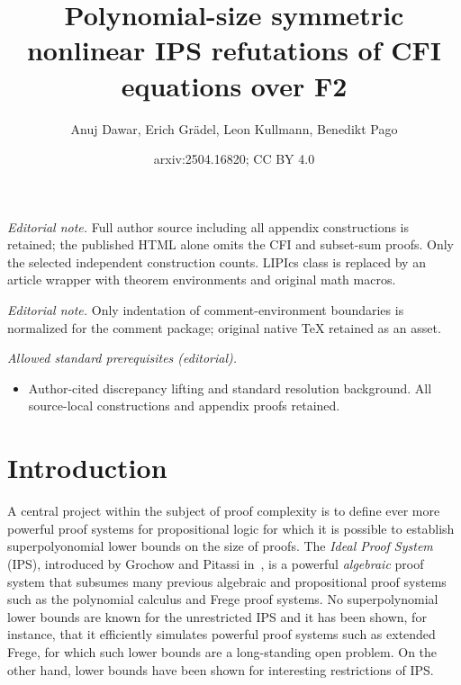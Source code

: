 \documentclass[10pt,a4paper]{article}
\title{Polynomial-size symmetric nonlinear IPS refutations of CFI equations over F2}
\author{Anuj Dawar, Erich Grädel, Leon Kullmann, Benedikt Pago}
\date{arxiv:2504.16820; CC BY 4.0}
\begin{document}
\maketitle
\noindent\textit{Editorial note.} Full author source including all appendix constructions is retained; the published HTML alone omits the CFI and subset-sum proofs. Only the selected independent construction counts. LIPIcs class is replaced by an article wrapper with theorem environments and original math macros.\par\medskip
\noindent\textit{Editorial note.} Only indentation of comment-environment boundaries is normalized for the comment package; original native TeX retained as an asset.\par\medskip
\noindent\textit{Allowed standard prerequisites (editorial).}\begin{itemize}
\item Author-cited discrepancy lifting and standard resolution background. All source-local constructions and appendix proofs retained.
\end{itemize}\medskip
	\section{Introduction}
	A central project within the subject of proof complexity \cite{pitassi, segerlind, krajicekBook} is to define ever more powerful proof systems for propositional logic for which it is possible to establish superpolyonomial lower bounds on the size of proofs. The \emph{Ideal Proof System} (IPS), introduced by Grochow and Pitassi in~\cite{IPS}, is a powerful \emph{algebraic} proof system that subsumes many previous algebraic and propositional proof systems such as the polynomial calculus and Frege proof systems. No superpolynomial lower bounds are known for the unrestricted IPS and it has been shown, for instance, that it efficiently simulates powerful proof systems such as extended Frege, for which such lower bounds are a long-standing open problem.  On the other hand, lower bounds have been shown for interesting restrictions of IPS.
	
\end{document}
